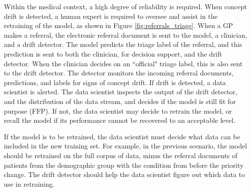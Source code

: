 \begin{displayquote}
  Within the medical context, a high degree of reliability is required. When concept drift is detected, a human expert is required to oversee and assist in the retraining of the model, as shown in Figure \ref{fig:referrals_triage}. When a GP makes a referral, the electronic referral document is sent to the model, a clinician, and a drift detector. The model predicts the triage label of the referral, and this prediction is sent to both the clinician, for decision support, and the drift detector. When the clinician decides on an ``official" triage label, this is also sent to the drift detector. The detector monitors the incoming referral documents, predictions, and labels for signs of concept drift. If drift is detected, a data scientist is alerted. The data scientist inspects the output of the drift detector, and the distribution of the data stream, and decides if the model is still fit for purpose (FFP). If not, the data scientist may decide to retrain the model, or recall the model if its performance cannot be recovered to an acceptable level.

  If the model is to be retrained, the data scientist must decide what data can be included in the new training set. For example, in the previous scenario, the model should be retrained on the full corpus of data, minus the referral documents of patients from the demographic group with the condition from before the priority change. The drift detector should help the data scientist figure out which data to use in retraining.
\end{displayquote}

